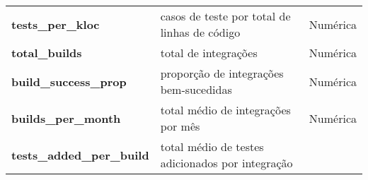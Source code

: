 \documentclass[]{article}
\begin{document}
\begin{longtable}[]{@{}lll@{}}
\begin{minipage}[t]{0.21\columnwidth}
\textbf{tests\_per\_kloc}\strut
\end{minipage} & \begin{minipage}[t]{0.61\columnwidth}\raggedright\strut
casos de teste por total de linhas de código\strut
\end{minipage} & \begin{minipage}[t]{0.10\columnwidth}\raggedright\strut
Numérica\strut
\end{minipage}\tabularnewline
\begin{minipage}[t]{0.21\columnwidth}\raggedright\strut
\textbf{total\_builds}\strut
\end{minipage} & \begin{minipage}[t]{0.61\columnwidth}\raggedright\strut
total de integrações\strut
\end{minipage} & \begin{minipage}[t]{0.10\columnwidth}\raggedright\strut
Numérica\strut
\end{minipage}\tabularnewline
\begin{minipage}[t]{0.21\columnwidth}\raggedright\strut
\textbf{build\_success\_prop}\strut
\end{minipage} & \begin{minipage}[t]{0.61\columnwidth}\raggedright\strut
proporção de integrações bem-sucedidas\strut
\end{minipage} & \begin{minipage}[t]{0.10\columnwidth}\raggedright\strut
Numérica\strut
\end{minipage}\tabularnewline
\begin{minipage}[t]{0.21\columnwidth}\raggedright\strut
\textbf{builds\_per\_month}\strut
\end{minipage} & \begin{minipage}[t]{0.61\columnwidth}\raggedright\strut
total médio de integrações por mês\strut
\end{minipage} & \begin{minipage}[t]{0.10\columnwidth}\raggedright\strut
Numérica\strut
\end{minipage}\tabularnewline
\begin{minipage}[t]{0.21\columnwidth}\raggedright\strut
\textbf{tests\_added\_per\_build}\strut
\end{minipage} & \begin{minipage}[t]{0.61\columnwidth}\raggedright\strut
total médio de testes adicionados por integração\strut
\end{minipage} & \begin{minipage}[t]{0.10\columnwidth}\raggedright\strut

\end{minipage}
\end{longtable}
\end{document}
